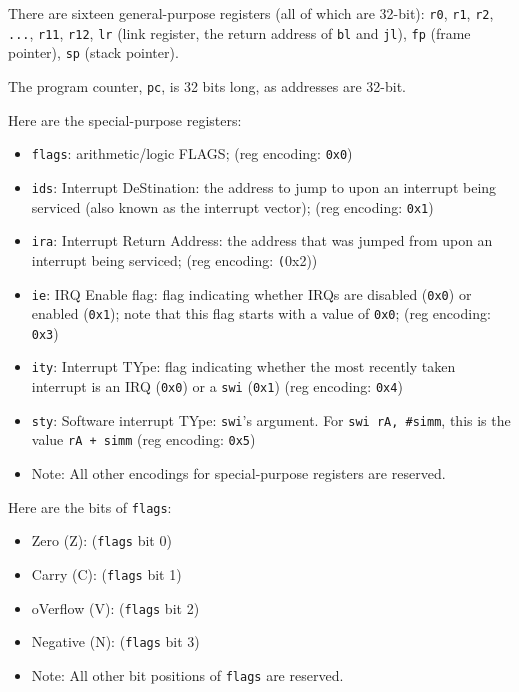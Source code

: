 \documentclass{article}
\begin{document}
	\doublespacing
	There are sixteen general-purpose registers (all of which are 32-bit):
	\texttt{r0}, \texttt{r1},
	\texttt{r2}, \texttt{...}, \texttt{r11}, \texttt{r12},
	\texttt{lr} (link register, the return address of \texttt{bl} and
		\texttt{jl}),
	\texttt{fp} (frame pointer), \texttt{sp} (stack pointer).

	The program counter, \texttt{pc}, is 32 bits long, as addresses are
	32-bit.

	Here are the special-purpose registers:
	\singlespacing
	\begin{itemize}
	\item \texttt{flags}: arithmetic/logic FLAGS;
		(reg encoding: \texttt{0x0})
	\item \texttt{ids}: Interrupt DeStination:
		the address to jump to upon an interrupt being serviced
			(also known as the interrupt vector);
		(reg encoding: \texttt{0x1})
	\item \texttt{ira}: Interrupt Return Address:
		the address that was jumped from upon an interrupt being
			serviced;
		(reg encoding: \texttt(0x2))
	\item \texttt{ie}: IRQ Enable flag:
		flag indicating whether IRQs are
			disabled (\texttt{0x0}) or enabled (\texttt{0x1});
		note that this flag starts with a value of \texttt{0x0};
		(reg encoding: \texttt{0x3})
	\item \texttt{ity}: Interrupt TYpe:
		flag indicating whether the most recently taken interrupt is an
			IRQ (\texttt{0x0}) or a \texttt{swi} (\texttt{0x1})
		(reg encoding: \texttt{0x4})
	\item \texttt{sty}: Software interrupt TYpe:
		\texttt{swi}'s argument. For \texttt{swi rA, \#simm}, this is the
			value \texttt{rA + simm}
		(reg encoding: \texttt{0x5})
	\item Note:
		All other encodings for special-purpose registers are reserved.
	\end{itemize}
	\doublespacing
	Here are the bits of \texttt{flags}:
	\singlespacing
	\begin{itemize}
	\item Zero (Z): (\texttt{flags} bit 0)
	\item Carry (C): (\texttt{flags} bit 1)
	\item oVerflow (V): (\texttt{flags} bit 2)
	\item Negative (N): (\texttt{flags} bit 3)
	\item Note:
		All other bit positions of \texttt{flags} are reserved.
	\end{itemize}
\end{document}
